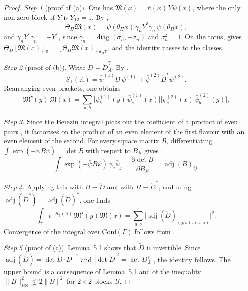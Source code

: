 \documentclass[11pt]{amsart}
\theoremstyle{definition}
\begin{document}
\begin{proof}
\emph{Step 1} (proof of (a)).
One has $\mathfrak M(x)=\bar\psi(x)\,Y\psi(x)$, where the only non-zero block of $Y$ is $Y_{12}=1$.
By \cite[Lemma~3.10\,(c)]{QEDII},
\begin{equation*}
\Theta_\Pi\mathfrak M(x)=\bar\psi(\theta_\Pi x)\,\gamma_nY^*\gamma_n\,\psi(\theta_\Pi x),
\end{equation*}
and $\gamma_nY^*\gamma_n=-Y^*$, since $\gamma_n=\operatorname{diag}(\sigma_n,-\sigma_n)$ and $\sigma_n^2=1$.
On the torus, \cite[Lemma~3.12]{QEDII} gives $\Theta_\Pi[\mathfrak M(x)]_{\mathbb T}=\allowbreak [\Theta_\Pi\mathfrak M(x)]_{\theta_\Pi\mathbb T}$, and the identity passes to the classes.

\emph{Step 2} (proof of (b)).
Write $\check D=\check D^{\mathbb T}_A$.
By \cite[Proposition~3.18\,(d)]{QEDII},
\begin{equation*}
S_{\mathbb T}(A)=\bar\psi^{(1)}\check D\,\psi^{(1)}+\bar\psi^{(2)}\check D^{*}\psi^{(2)}.
\end{equation*}
Rearranging even brackets, one obtains
\begin{equation*}
\mathfrak M^\star(y)\,\mathfrak M(x)=\sum_{a,b}\bigl[\psi^{(1)}_b(y)\,\bar\psi^{(1)}_a(x)\bigr]\bigl[\psi^{(2)}_a(x)\,\bar\psi^{(2)}_b(y)\bigr].
\end{equation*}

\emph{Step 3.}
Since the Berezin integral picks out the coefficient of a product of even pairs \cite[Definition~2.8]{QEDII}, it factorises on the product of an even element of the first flavour with an even element of the second.
For every square matrix $B$, differentiating $\int\exp(-\bar\psi B\psi)=\det B$ with respect to $B_{ji}$ gives
\begin{equation*}
\int\exp(-\bar\psi B\psi)\,\psi_i\bar\psi_j=\frac{\partial\det B}{\partial B_{ji}}=\operatorname{adj}(B)_{ij}.
\end{equation*}

\emph{Step 4.}
Applying this with $B=\check D$ and with $B=\check D^*$, and using $\operatorname{adj}(\check D^*)=\operatorname{adj}(\check D)^*$, one finds
\begin{equation*}
\int_{\mathbb T}e^{-S_{\mathbb T}(A)}\,\mathfrak M^\star(y)\,\mathfrak M(x)=\sum_{a,b}\bigl|\operatorname{adj}(\check D)_{(y,b),(x,a)}\bigr|^2.
\end{equation*}
Convergence of the integral over $\mathrm{Conf}(\Gamma)$ follows from \cite[Lemma~3.13\,(b)]{QEDII}.

\emph{Step 5} (proof of (c)).
Lemma~5.1 shows that $\check D$ is invertible.
Since $\operatorname{adj}(\check D)=\det\check D\cdot\check D^{-1}$ and $|\det\check D|^2=\det D^{\mathbb T}_A$ \cite[Proposition~3.18\,(d)]{QEDII}, the identity follows.
The upper bound is a consequence of Lemma~5.1 and of the inequality $\|B\|_{\mathrm{HS}}^2\le2\|B\|^2$ for $2\times2$ blocks $B$.


\end{proof}
\end{document}
